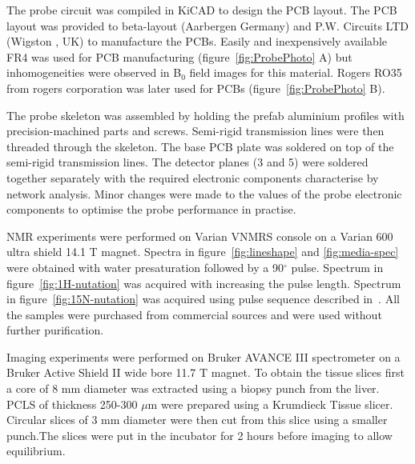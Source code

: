 \documentclass[preprint,12pt]{article}
\begin{document}
The probe circuit was compiled in KiCAD to design the PCB layout. The PCB layout was provided to beta-layout (Aarbergen Germany) and P.W. Circuits LTD (Wigston , UK) to manufacture the PCBs. Easily and inexpensively available FR4 was used for PCB manufacturing (figure~\ref{fig:ProbePhoto} A) but inhomogeneities were observed in B${_0}$ field images for this material. Rogers RO35 from rogers corporation was later used for PCBs (figure~\ref{fig:ProbePhoto} B).\par
The probe skeleton was assembled by holding the prefab aluminium profiles with precision-machined parts and screws. Semi-rigid transmission lines were then threaded through the skeleton. The base PCB plate was soldered on top of the semi-rigid transmission lines. The detector planes (3 and 5) were soldered together separately with the required electronic components characterise by network analysis. Minor changes were made to the values of the probe electronic components to optimise the probe performance in practise.\par
NMR experiments were performed on Varian VNMRS console on a Varian 600 ultra shield 14.1 T magnet. Spectra in figure~\ref{fig:lineshape} and \ref{fig:media-spec} were obtained with water presaturation followed by a 90$^{\circ}$ pulse. Spectrum in figure~\ref{fig:1H-nutation} was acquired with increasing the pulse length. Spectrum in figure~\ref{fig:15N-nutation} was acquired using pulse sequence described in~\cite{bax_indirect}. All the samples were purchased from commercial sources and were used without further purification.\par
Imaging experiments were performed on Bruker AVANCE III spectrometer on a Bruker Active Shield II wide bore 11.7 T magnet. To obtain the tissue slices first a core of 8 mm diameter was extracted using a biopsy punch from the liver. PCLS of thickness 250-300 $\mu$m were prepared using a Krumdieck Tissue slicer. Circular slices of 3 mm diameter were then cut from this slice using a smaller punch.The slices were put in the incubator for 2 hours before imaging to allow equilibrium.
\end{document}
